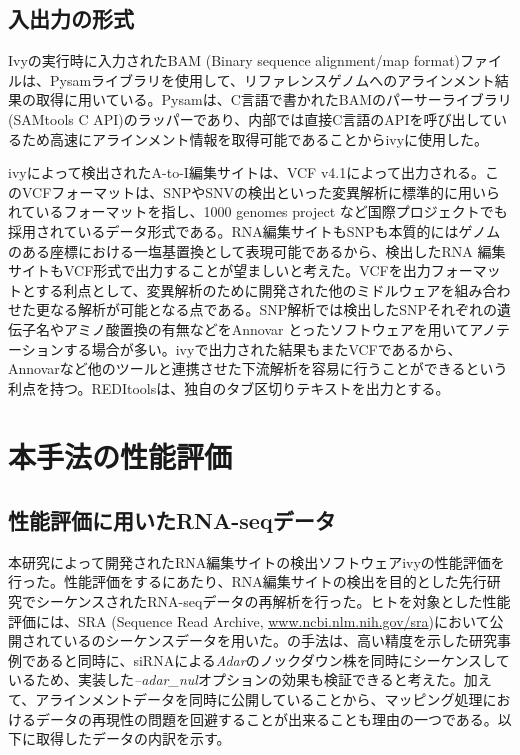 \subsection{入出力の形式}
Ivyの実行時に入力されたBAM (Binary sequence alignment/map format)ファイルは、Pysamライブラリを使用して、リファレンスゲノムへのアラインメント結果の取得に用いている。Pysamは、C言語で書かれたBAMのパーサーライブラリ (SAMtools C API)のラッパーであり、内部では直接C言語のAPIを呼び出しているため高速にアラインメント情報を取得可能であることからivyに使用した。
\par
ivyによって検出されたA-to-I編集サイトは、VCF v4.1によって出力される。このVCFフォーマットは、SNPやSNVの検出といった変異解析に標準的に用いられているフォーマットを指し、1000 genomes project など国際プロジェクトでも採用されているデータ形式である。RNA編集サイトもSNPも本質的にはゲノムのある座標における一塩基置換として表現可能であるから、検出したRNA 編集サイトもVCF形式で出力することが望ましいと考えた。VCFを出力フォーマットとする利点として、変異解析のために開発された他のミドルウェアを組み合わせた更なる解析が可能となる点である。SNP解析では検出したSNPそれぞれの遺伝子名やアミノ酸置換の有無などをAnnovar \citep{Wang:2010aa}とったソフトウェアを用いてアノテーションする場合が多い。ivyで出力された結果もまたVCFであるから、Annovarなど他のツールと連携させた下流解析を容易に行うことができるという利点を持つ。REDItoolsは、独自のタブ区切りテキストを出力とする。

\section{本手法の性能評価}
\subsection{性能評価に用いたRNA-seqデータ}
本研究によって開発されたRNA編集サイトの検出ソフトウェアivyの性能評価を行った。性能評価をするにあたり、RNA編集サイトの検出を目的とした先行研究でシーケンスされたRNA-seqデータの再解析を行った。ヒトを対象とした性能評価には、SRA (Sequence Read Archive, \url{www.ncbi.nlm.nih.gov/sra})において公開されている\cite{BahLeeLi1201}のシーケンスデータを用いた。\cite{BahLeeLi1201}の手法は、高い精度を示した研究事例であると同時に、siRNAによる\textit{Adar}のノックダウン株を同時にシーケンスしているため、実装した\textit{--adar\_nul}オプションの効果も検証できると考えた。加えて、アラインメントデータを同時に公開していることから、マッピング処理におけるデータの再現性の問題を回避することが出来ることも理由の一つである。以下に取得したデータの内訳を示す。

